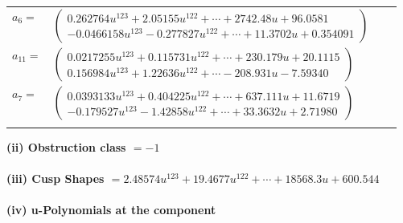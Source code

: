 \documentclass[1p]{elsarticle_modified}
\theoremstyle{definition}
\begin{document}
\begin{tabular}{m{7pt} m{180pt} m{7pt} m{180pt} }
\flushright $a_{6}=$&$\begin{pmatrix}0.262764 u^{123}+2.05155 u^{122}+\cdots+2742.48 u+96.0581\\-0.0466158 u^{123}-0.277827 u^{122}+\cdots+11.3702 u+0.354091\end{pmatrix}$ \\
\flushright $a_{11}=$&$\begin{pmatrix}0.0217255 u^{123}+0.115731 u^{122}+\cdots+230.179 u+20.1115\\0.156984 u^{123}+1.22636 u^{122}+\cdots-208.931 u-7.59340\end{pmatrix}$ \\
\flushright $a_{7}=$&$\begin{pmatrix}0.0393133 u^{123}+0.404225 u^{122}+\cdots+637.111 u+11.6719\\-0.179527 u^{123}-1.42858 u^{122}+\cdots+33.3632 u+2.71980\end{pmatrix}$\\&\end{tabular}
\flushleft \textbf{(ii) Obstruction class $= -1$}\\~\\
\flushleft \textbf{(iii) Cusp Shapes $= 2.48574 u^{123}+19.4677 u^{122}+\cdots+18568.3 u+600.544$}\\~\\
\newpage\renewcommand{\arraystretch}{1}
\flushleft \textbf{(iv) u-Polynomials at the component}\newline \\
\end{document}

